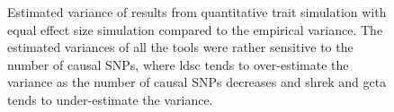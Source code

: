 \begin{figure}
{				
				\label{fig:ldscInQtEqualVarCom}
			}
			\caption[Quantitative Trait with Equal Effect Size Simulation Result(Estimated Variance)]
			{Estimated variance of results from quantitative trait simulation with equal effect size simulation compared to the empirical variance.
				The estimated variances of all the tools were rather sensitive to the number of causal \glspl{SNP}, where \gls{ldsc} tends to over-estimate the variance as the number of causal \glspl{SNP} decreases and \gls{shrek} and \gls{gcta} tends to under-estimate the variance.} 
			\label{fig:QtEqualVarCom}
		\end{figure}